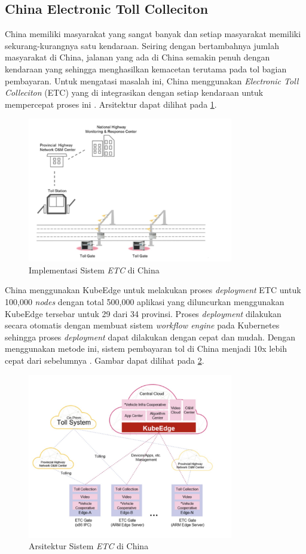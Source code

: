 
\subsection{China Electronic Toll Colleciton}
China memiliki masyarakat yang sangat banyak dan setiap masyarakat memiliki sekurang-kurangnya satu kendaraan. Seiring dengan bertambahnya jumlah masyarakat di China, jalanan yang ada di China semakin penuh dengan kendaraan yang sehingga menghasilkan kemacetan terutama pada tol bagian pembayaran. Untuk mengatasi masalah ini, China menggunakan \textit{Electronic Toll Colleciton} (ETC) yang di integrasikan dengan setiap kendaraan untuk mempercepat proses ini \parencite{penelitianterkait1}. Arsitektur dapat dilihat pada \ref{fig:china-highways}.

\begin{figure}[ht]
  \centering
  \includegraphics[width=0.8\textwidth]{resources/chapter-2/china-highways.jpg}
  \caption{Implementasi Sistem \textit{ETC} di China \parencite{penelitianterkait1}}
  \label{fig:china-highways}
\end{figure}

China menggunakan KubeEdge untuk melakukan proses \textit{deployment} ETC untuk 100,000 \textit{nodes} dengan total 500,000 aplikasi yang diluncurkan menggunakan KubeEdge tersebar untuk 29 dari 34 provinsi. Proses \textit{deployment} dilakukan secara otomatis dengan membuat sistem \textit{workflow engine} pada Kubernetes sehingga proses \textit{deployment} dapat dilakukan dengan cepat dan mudah. Dengan menggunakan metode ini, sistem pembayaran tol di China menjadi 10x lebih cepat dari sebelumnya \parencite{penelitianterkait1}. Gambar dapat dilihat pada \ref{fig:architecture-china-highways}.

\begin{figure}[ht]
  \includegraphics[width=0.8\textwidth]{resources/chapter-2/arsitektur-china-highways.jpg}
  \caption{Arsitektur Sistem \textit{ETC} di China \parencite{penelitianterkait1}}
  \label{fig:architecture-china-highways}
\end{figure}